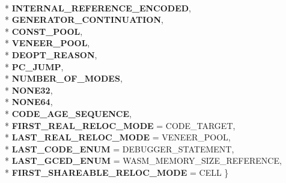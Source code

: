\begin{DoxyCompactItemize}
\\*
{\bfseries I\+N\+T\+E\+R\+N\+A\+L\+\_\+\+R\+E\+F\+E\+R\+E\+N\+C\+E\+\_\+\+E\+N\+C\+O\+D\+ED}, 
\\*
{\bfseries G\+E\+N\+E\+R\+A\+T\+O\+R\+\_\+\+C\+O\+N\+T\+I\+N\+U\+A\+T\+I\+ON}, 
\\*
{\bfseries C\+O\+N\+S\+T\+\_\+\+P\+O\+OL}, 
\\*
{\bfseries V\+E\+N\+E\+E\+R\+\_\+\+P\+O\+OL}, 
\\*
{\bfseries D\+E\+O\+P\+T\+\_\+\+R\+E\+A\+S\+ON}, 
\\*
{\bfseries P\+C\+\_\+\+J\+U\+MP}, 
\\*
{\bfseries N\+U\+M\+B\+E\+R\+\_\+\+O\+F\+\_\+\+M\+O\+D\+ES}, 
\\*
{\bfseries N\+O\+N\+E32}, 
\\*
{\bfseries N\+O\+N\+E64}, 
\\*
{\bfseries C\+O\+D\+E\+\_\+\+A\+G\+E\+\_\+\+S\+E\+Q\+U\+E\+N\+CE}, 
\\*
{\bfseries F\+I\+R\+S\+T\+\_\+\+R\+E\+A\+L\+\_\+\+R\+E\+L\+O\+C\+\_\+\+M\+O\+DE} = C\+O\+D\+E\+\_\+\+T\+A\+R\+G\+ET, 
\\*
{\bfseries L\+A\+S\+T\+\_\+\+R\+E\+A\+L\+\_\+\+R\+E\+L\+O\+C\+\_\+\+M\+O\+DE} = V\+E\+N\+E\+E\+R\+\_\+\+P\+O\+OL, 
\\*
{\bfseries L\+A\+S\+T\+\_\+\+C\+O\+D\+E\+\_\+\+E\+N\+UM} = D\+E\+B\+U\+G\+G\+E\+R\+\_\+\+S\+T\+A\+T\+E\+M\+E\+NT, 
\\*
{\bfseries L\+A\+S\+T\+\_\+\+G\+C\+E\+D\+\_\+\+E\+N\+UM} = W\+A\+S\+M\+\_\+\+M\+E\+M\+O\+R\+Y\+\_\+\+S\+I\+Z\+E\+\_\+\+R\+E\+F\+E\+R\+E\+N\+CE, 
\\*
{\bfseries F\+I\+R\+S\+T\+\_\+\+S\+H\+A\+R\+E\+A\+B\+L\+E\+\_\+\+R\+E\+L\+O\+C\+\_\+\+M\+O\+DE} = C\+E\+LL
 \}\hypertarget{classv8_1_1internal_1_1_reloc_info_a86a473758194fc2e4bf836e53a6db856}{}\label{classv8_1_1internal_1_1_reloc_info_a86a473758194fc2e4bf836e53a6db856}

\end{DoxyCompactItemize}
